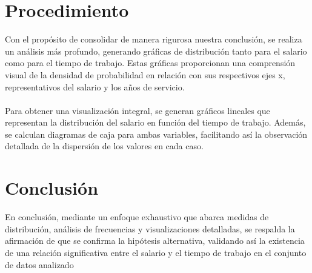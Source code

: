 \documentclass{article}
\begin{document}
\section{Procedimiento}
Con el propósito de consolidar de manera rigurosa nuestra conclusión, se realiza un análisis más profundo, generando gráficas de distribución tanto para el salario como para el tiempo de trabajo. Estas gráficas proporcionan una comprensión visual de la densidad de probabilidad en relación con sus respectivos ejes x, representativos del salario y los años de servicio.
\\\\
Para obtener una visualización integral, se generan gráficos lineales que representan la distribución del salario en función del tiempo de trabajo. Además, se calculan diagramas de caja para ambas variables, facilitando así la observación detallada de la dispersión de los valores en cada caso.

\section{Conclusión}
En conclusión, mediante un enfoque exhaustivo que abarca medidas de distribución, análisis de frecuencias y visualizaciones detalladas, se respalda la afirmación de que se confirma la hipótesis alternativa, validando así la existencia de una relación significativa entre el salario y el tiempo de trabajo en el conjunto de datos analizado
\end{document}
